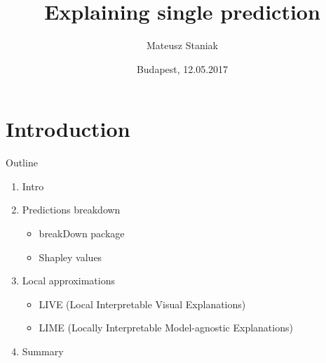 \documentclass[xcolor={dvipsnames}]{beamer}
\title[Local interpretability]{Explaining single prediction}
\author{Mateusz Staniak}
\institute{University of Wroc{\l}aw}
\date{Budapest, 12.05.2017}
\begin{document}
	
	

	\begin{frame}
		\titlepage
	\end{frame}
	
	\section{Introduction}
	
	\begin{frame}{Outline}
		\begin{enumerate}
			\item Intro
			
			\item Predictions breakdown
			
			\begin{itemize}
				\item breakDown package
				
				\item Shapley values
			\end{itemize}

			
			\item Local approximations
			
			\begin{itemize}
				\item LIVE (Local Interpretable Visual Explanations)
				
				\item LIME (Locally Interpretable Model-agnostic Explanations)
			\end{itemize}
			
			\item Summary
			
		\end{enumerate}
	\end{frame}
	
\end{document}
